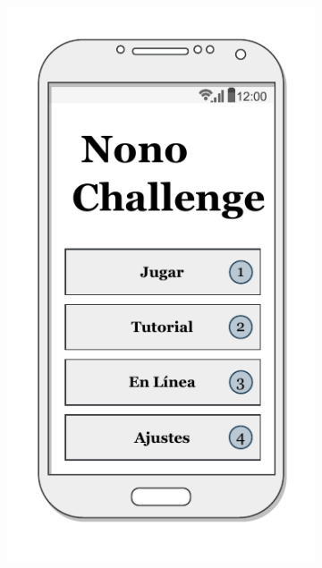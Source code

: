 \begin{figure}[H]
    \centering
    \begin{subfigure}[b]{0.38\linewidth}
      \includegraphics[width=\linewidth]{images/screen1.pdf}
    \end{subfigure}
    \begin{subfigure}[b]{0.38\linewidth}

\end{subfigure}
\end{figure}
